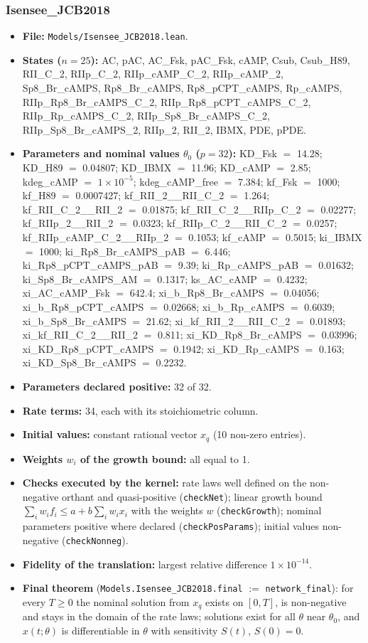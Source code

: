 \subsubsection*{Isensee\_JCB2018}

\begin{itemize}\itemsep0pt\small
\item \textbf{File:} \texttt{Models/Isensee\_JCB2018.lean}.
\item \textbf{States ($n=25$):} AC, pAC, AC\_Fsk, pAC\_Fsk, cAMP, Csub, Csub\_H89, RII\_C\_2, RIIp\_C\_2, RIIp\_cAMP\_C\_2, RIIp\_cAMP\_2, Sp8\_Br\_cAMPS, Rp8\_Br\_cAMPS, Rp8\_pCPT\_cAMPS, Rp\_cAMPS, RIIp\_Rp8\_Br\_cAMPS\_C\_2, RIIp\_Rp8\_pCPT\_cAMPS\_C\_2, RIIp\_Rp\_cAMPS\_C\_2, RIIp\_Sp8\_Br\_cAMPS\_C\_2, RIIp\_Sp8\_Br\_cAMPS\_2, RIIp\_2, RII\_2, IBMX, PDE, pPDE.
\item \textbf{Parameters and nominal values $\theta_0$ ($p=32$):} KD\_Fsk $=$ 14.28; KD\_H89 $=$ 0.04807; KD\_IBMX $=$ 11.96; KD\_cAMP $=$ 2.85; kdeg\_cAMP $=$ $1\times10^{-5}$; kdeg\_cAMP\_free $=$ 7.384; kf\_Fsk $=$ 1000; kf\_H89 $=$ 0.0007427; kf\_RII\_2\_\_RII\_C\_2 $=$ 1.264; kf\_RII\_C\_2\_\_RII\_2 $=$ 0.01875; kf\_RII\_C\_2\_\_RIIp\_C\_2 $=$ 0.02277; kf\_RIIp\_2\_\_RII\_2 $=$ 0.0323; kf\_RIIp\_C\_2\_\_RII\_C\_2 $=$ 0.0257; kf\_RIIp\_cAMP\_C\_2\_\_RIIp\_2 $=$ 0.1053; kf\_cAMP $=$ 0.5015; ki\_IBMX $=$ 1000; ki\_Rp8\_Br\_cAMPS\_pAB $=$ 6.446; ki\_Rp8\_pCPT\_cAMPS\_pAB $=$ 9.39; ki\_Rp\_cAMPS\_pAB $=$ 0.01632; ki\_Sp8\_Br\_cAMPS\_AM $=$ 0.1317; ks\_AC\_cAMP $=$ 0.4232; xi\_AC\_cAMP\_Fsk $=$ 642.4; xi\_b\_Rp8\_Br\_cAMPS $=$ 0.04056; xi\_b\_Rp8\_pCPT\_cAMPS $=$ 0.02668; xi\_b\_Rp\_cAMPS $=$ 0.6039; xi\_b\_Sp8\_Br\_cAMPS $=$ 21.62; xi\_kf\_RII\_2\_\_RII\_C\_2 $=$ 0.01893; xi\_kf\_RII\_C\_2\_\_RII\_2 $=$ 0.811; xi\_KD\_Rp8\_Br\_cAMPS $=$ 0.03996; xi\_KD\_Rp8\_pCPT\_cAMPS $=$ 0.1942; xi\_KD\_Rp\_cAMPS $=$ 0.163; xi\_KD\_Sp8\_Br\_cAMPS $=$ 0.2232.
\item \textbf{Parameters declared positive:} 32 of 32.
\item \textbf{Rate terms:} 34, each with its stoichiometric column.
\item \textbf{Initial values:} constant rational vector $x_q$ (10 non-zero entries).
\item \textbf{Weights $w_i$ of the growth bound:} all equal to 1.
\item \textbf{Checks executed by the kernel:} rate laws well defined on the non-negative orthant and quasi-positive (\texttt{checkNet}); linear growth bound $\sum_iw_if_i\le a+b\sum_iw_ix_i$ with the weights $w$ (\texttt{checkGrowth}); nominal parameters positive where declared (\texttt{checkPosParams}); initial values non-negative (\texttt{checkNonneg}).
\item \textbf{Fidelity of the translation:} largest relative difference $1\times10^{-14}$.
\item \textbf{Final theorem} (\texttt{Models.Isensee\_JCB2018.final} $:=$ \texttt{network\_final}): for every $T\ge0$ the nominal solution from $x_q$ exists on $[0,T]$, is non-negative and stays in the domain of the rate laws; solutions exist for all $\theta$ near $\theta_0$, and $x(t;\theta)$ is differentiable in $\theta$ with sensitivity $S(t)$, $S(0)=0$.
\end{itemize}

